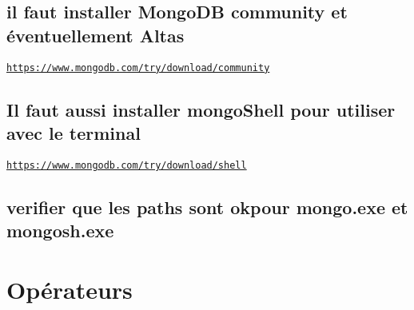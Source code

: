 \subsection*{il faut installer Mongo\+DB community et éventuellement Altas}

\href{https://www.mongodb.com/try/download/community}{\tt https\+://www.\+mongodb.\+com/try/download/community}

\subsection*{Il faut aussi installer mongo\+Shell pour utiliser avec le terminal}

\href{https://www.mongodb.com/try/download/shell}{\tt https\+://www.\+mongodb.\+com/try/download/shell}

\subsection*{verifier que les paths sont okpour mongo.\+exe et mongosh.\+exe}

\section*{Opérateurs}


